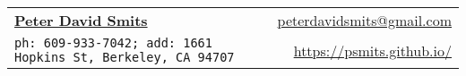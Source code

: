 \documentclass[letterpaper,11pt]{article}
\newcommand{\resheading}[1]{{\large \colorbox{mygrey}{\begin{minipage}{\textwidth}{\textbf{#1 \vphantom{p\^{E}}}}\end{minipage}}}}
\begin{document}
\newcommand{\mywebheader}{
\begin{tabular*}{7in}{l@{\extracolsep{\fill}}r}
	\textbf{\href{https://psmits.github.io/}{\LARGE Peter David Smits}} & \href{mailto:peterdavidsmits@gmail.com}{peterdavidsmits@gmail.com}\\
    {\footnotesize \texttt{ph: 609-933-7042; add: 1661 Hopkins St, Berkeley, CA 94707 }} & \href{https://psmits.github.io/}{https://psmits.github.io/} \\
	\end{tabular*}
\\
\vspace{0.1in}}

\mywebheader

\end{document}
